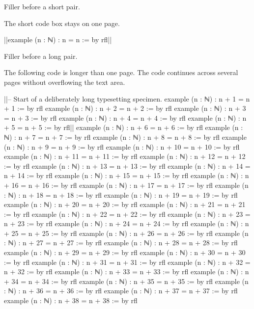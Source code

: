 \documentclass{article}
\begin{document}
\noindent\rule{0pt}{95mm}
Filler before a short pair.
\label{before-short}
\par
The short code box stays on one page.
\label{short-prose}

\begin{lean}
  |\label{short-start}|example (n : ℕ) : n = n := by
    rfl|\label{short-end}|
\end{lean}

\clearpage
\noindent\rule{0pt}{70mm}
Filler before a long pair.
\label{before-long}
\par
The following code is longer than one page. The code continues across several pages
without overflowing the text area.
\label{long-prose}

\begin{lean}
  |\label{long-start}|-- Start of a deliberately long typesetting specimen.
  example (n : ℕ) : n + 1 = n + 1 := by rfl
  example (n : ℕ) : n + 2 = n + 2 := by rfl
  example (n : ℕ) : n + 3 = n + 3 := by rfl
  example (n : ℕ) : n + 4 = n + 4 := by rfl
  example (n : ℕ) : n + 5 = n + 5 := by rfl|\label{long-sixth}|
  example (n : ℕ) : n + 6 = n + 6 := by rfl
  example (n : ℕ) : n + 7 = n + 7 := by rfl
  example (n : ℕ) : n + 8 = n + 8 := by rfl
  example (n : ℕ) : n + 9 = n + 9 := by rfl
  example (n : ℕ) : n + 10 = n + 10 := by rfl
  example (n : ℕ) : n + 11 = n + 11 := by rfl
  example (n : ℕ) : n + 12 = n + 12 := by rfl
  example (n : ℕ) : n + 13 = n + 13 := by rfl
  example (n : ℕ) : n + 14 = n + 14 := by rfl
  example (n : ℕ) : n + 15 = n + 15 := by rfl
  example (n : ℕ) : n + 16 = n + 16 := by rfl
  example (n : ℕ) : n + 17 = n + 17 := by rfl
  example (n : ℕ) : n + 18 = n + 18 := by rfl
  example (n : ℕ) : n + 19 = n + 19 := by rfl
  example (n : ℕ) : n + 20 = n + 20 := by rfl
  example (n : ℕ) : n + 21 = n + 21 := by rfl
  example (n : ℕ) : n + 22 = n + 22 := by rfl
  example (n : ℕ) : n + 23 = n + 23 := by rfl
  example (n : ℕ) : n + 24 = n + 24 := by rfl
  example (n : ℕ) : n + 25 = n + 25 := by rfl
  example (n : ℕ) : n + 26 = n + 26 := by rfl
  example (n : ℕ) : n + 27 = n + 27 := by rfl
  example (n : ℕ) : n + 28 = n + 28 := by rfl
  example (n : ℕ) : n + 29 = n + 29 := by rfl
  example (n : ℕ) : n + 30 = n + 30 := by rfl
  example (n : ℕ) : n + 31 = n + 31 := by rfl
  example (n : ℕ) : n + 32 = n + 32 := by rfl
  example (n : ℕ) : n + 33 = n + 33 := by rfl
  example (n : ℕ) : n + 34 = n + 34 := by rfl
  example (n : ℕ) : n + 35 = n + 35 := by rfl
  example (n : ℕ) : n + 36 = n + 36 := by rfl
  example (n : ℕ) : n + 37 = n + 37 := by rfl
  example (n : ℕ) : n + 38 = n + 38 := by rfl

\end{lean}
\end{document}
